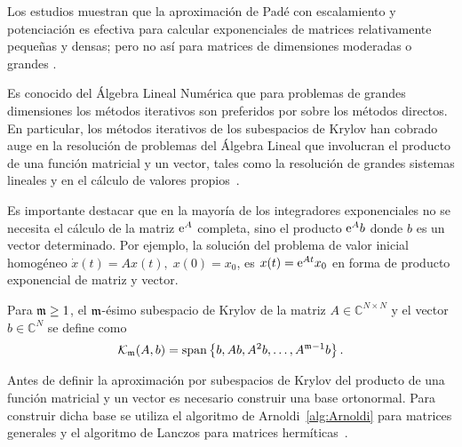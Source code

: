 Los estudios muestran que la aproximación de Padé con escalamiento y potenciación
es efectiva para calcular exponenciales de matrices relativamente pequeñas y densas; pero no así para matrices de dimensiones moderadas o grandes \cite{moler2003nineteen}.

Es conocido del Álgebra Lineal Numérica que para problemas de
grandes dimensiones los métodos iterativos son preferidos por sobre los métodos directos.
En particular,
los métodos iterativos de los subespacios de Krylov han cobrado auge en la resolución de
problemas del Álgebra Lineal que involucran el producto de una función matricial y un vector,
tales como la resolución de grandes sistemas lineales y en el cálculo de valores
propios~\cite{golub2013matrix}.

Es importante destacar que en la mayoría de los integradores exponenciales
 no se necesita el cálculo de la matriz $\mathrm{e}^{A}$ completa, sino
el producto $\mathrm{e}^{A}b$ donde $b$ es un vector determinado. Por ejemplo, la solución del problema de valor inicial homogéneo $\dot{x}(t)=Ax(t),\;x(0)=x_0$, es $x(t)=\mathrm{e}^{At}x_0$ en forma de producto exponencial de matriz y vector. 

\begin{definition}
        \cite{Saad92} Para $\mathfrak{m}\geq 1$, el $\mathfrak{m}$-ésimo subespacio de Krylov de la matriz $A\in\mathbb{C}^{N\times N}$
    y el vector $b\in\mathbb{C}^{N}$ se define como
    \[ \mathcal{K}_{\mathfrak{m}}(A,b)=\mathrm{span}\left\{ b,Ab,A^{2}b,\ldots,A^{\mathfrak{m}-1}b \right\}. \]
\end{definition}

Antes de definir la aproximación por subespacios de Krylov del producto de una función matricial y un vector es
necesario construir una base ortonormal. Para construir dicha base se utiliza el algoritmo de
Arnoldi~\ref{alg:Arnoldi} para matrices generales y el algoritmo de 
Lanczos para matrices hermíticas~\cite{arnoldi,saad2003iterative}.


